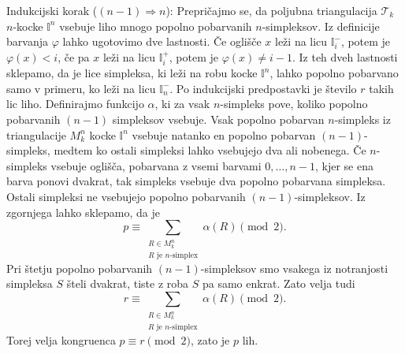\documentclass[mat1]{fmfdelo}
\newcommand{\I}{\mathbb I}
\newcommand{\0}{0}
\newcommand{\pT}{\mathcal T}
\begin{document}
\begin{dokaz}
Indukcijski korak ($(n - 1) \Longrightarrow n$):
Prepričajmo se, da poljubna triangulacija $\pT_k$ $n$-kocke $\I^n$ vsebuje liho mnogo popolno pobarvanih $n$-simpleksov. Iz definicije barvanja $\varphi$ lahko ugotovimo dve lastnosti. Če oglišče $x$ leži na licu $\I_i^-$, potem je $\varphi(x) < i$, če pa $x$ leži na licu $\I_i^+$, potem je $\varphi(x) \neq i -1$. Iz teh dveh lastnosti sklepamo, da je lice simpleksa, ki leži na robu kocke $\I^n$, lahko popolno pobarvano samo v primeru, ko leži na licu $\I_n^-$. Po indukcijski predpostavki je število $r$ takih lic liho. 
Definirajmo funkcijo $\alpha$, ki za vsak $n$-simpleks pove, koliko popolno pobarvanih $(n-1)$ simpleksov vsebuje. Vsak popolno pobarvan $n$-simpleks iz triangulacije $M_k^n$ kocke $\I^n$ vsebuje natanko en popolno pobarvan $(n-1)$-simpleks, medtem ko ostali simpleksi lahko vsebujejo dva ali nobenega. Če $n$-simpleks vsebuje oglišča, pobarvana z vsemi barvami $0, \dots, n-1$, kjer se ena barva ponovi dvakrat, tak simpleks vsebuje dva popolno pobarvana simpleksa. Ostali simpleksi ne vsebujejo popolno pobarvanih $(n - 1)$-simpleksov. Iz zgornjega lahko sklepamo, da je 
$$p \equiv 
\sum\limits_{\substack{
R \in M_k^n
 \\ 
R\text{ je } n\text{-simplex}
 }}
  \alpha(R) \pmod 2.$$
Pri štetju popolno pobarvanih $(n - 1)$-simpleksov smo vsakega iz notranjosti simpleksa $S$ šteli dvakrat, tiste z roba $S$ pa samo enkrat. Zato velja tudi 
$$r \equiv 
\sum\limits_{\substack{
R \in M_k^n
 \\ 
R\text{ je } n\text{-simplex}
 }}
  \alpha(R) \pmod 2.$$ 
Torej velja kongruenca $p \equiv r \pmod 2$, zato je $p$ lih.
\end{dokaz}
\end{document}
